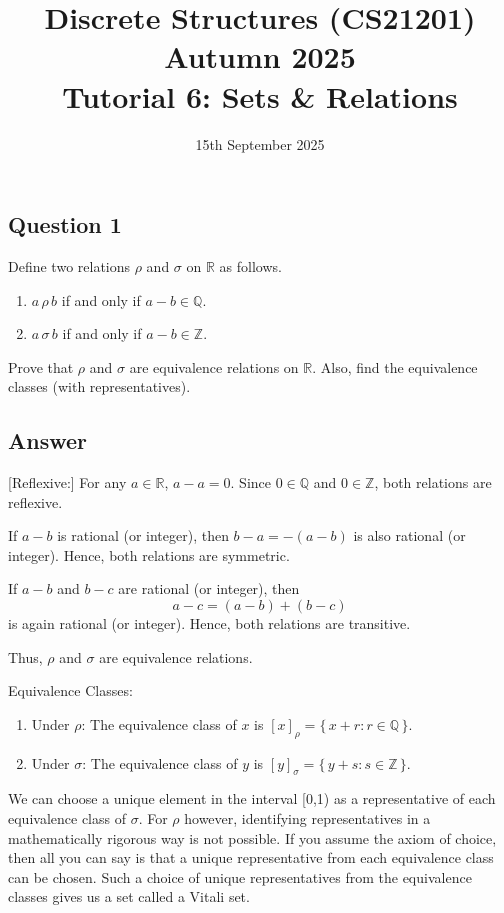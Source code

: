\documentclass{article}
\title{\large Discrete Structures (CS21201) Autumn 2025\\ \vspace{0.5em} \LARGE Tutorial 6: Sets \& Relations}
\date{15th September 2025}
\begin{document}
\maketitle

\subsection*{Question 1}
Define two relations $\rho$ and $\sigma$ on $\mathbb{R}$ as follows.  
\begin{enumerate}
    \item $a \,\rho\, b$ if and only if $a - b \in \mathbb{Q}$.
    \item $a \,\sigma\, b$ if and only if $a - b \in \mathbb{Z}$.
\end{enumerate}

Prove that $\rho$ and $\sigma$ are equivalence relations on $\mathbb{R}$. Also, find the equivalence classes (with representatives).

\subsection*{Answer}
[Reflexive:]  
For any $a \in \mathbb{R}$, $a - a = 0$. Since $0 \in \mathbb{Q}$ and $0 \in \mathbb{Z}$, both relations are reflexive.

\medskip
[Symmetric:]  
If $a - b$ is rational (or integer), then $b - a = -(a - b)$ is also rational (or integer). Hence, both relations are symmetric.

\medskip
[Transitive:] 
If $a - b$ and $b - c$ are rational (or integer), then
\[
a - c = (a - b) + (b - c)
\]
is again rational (or integer). Hence, both relations are transitive.

\medskip
Thus, $\rho$ and $\sigma$ are equivalence relations.

\medskip
Equivalence Classes:
\begin{enumerate}
    \item Under $\rho$:  
    The equivalence class of $x$ is $
    [x]_\rho = \{\, x + r : r \in \mathbb{Q} \,\}.
    $

    \item Under $\sigma$:  
    The equivalence class of $y$ is $
    [y]_\sigma = \{\, y + s : s \in \mathbb{Z} \,\}.
    $
\end{enumerate}

We can choose a unique element in the interval [0,1) as a representative of each equivalence class of $\sigma$. For $\rho$
however, identifying representatives in a mathematically rigorous way is not possible. If you assume the axiom
of choice, then all you can say is that a unique representative from each equivalence class can be chosen. Such
a choice of unique representatives from the equivalence classes gives us a set called a Vitali set.
\end{document}
